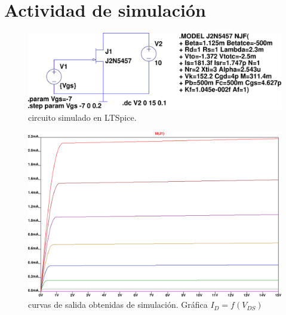 \documentclass[chaptersright]{informeutn}
\begin{document}
    \section{Actividad de simulación}
    \begin{figure}[ht!]
        \centering
        \includegraphics[width=1\linewidth]{pictures/caract-salida.png}
        \caption{circuito simulado en LTSpice.}
    \end{figure}
    
    \begin{figure}[ht!]
        \centering
        \includegraphics[width=0.9\linewidth]{pictures/graf-caract-salida.png}
        \caption{curvas de salida obtenidas de simulación. Gráfica $I_D = f(V_{DS})$}
    \end{figure}
    
\end{document}

